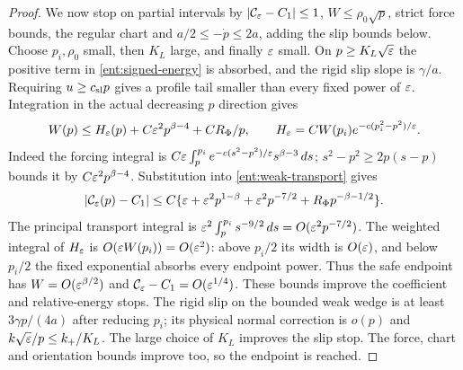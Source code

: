 \begin{proof}
We now stop on partial intervals by
$|\mathcal C_\varepsilon-C_1|\le1$, $W\le\rho_0\sqrt p$, strict force
bounds, the regular chart and $a/2\le-\dot p\le2a$, adding the
slip bounds below. Choose $p_i,\rho_0$ small, then $K_L$ large,
and finally $\varepsilon$ small. On $p\ge K_L\sqrt{\varepsilon}$ the positive
term in \eqref{ent:signed-energy} is absorbed, and the rigid slip
slope is $\gamma/a$. Requiring $u\ge c_{\rm sl}p$ gives a profile
tail smaller than every fixed power of $\varepsilon$. Integration in the
actual decreasing $p$ direction gives
\begin{equation}
 W(p)\le H_\varepsilon(p)+C\varepsilon^2p^{\beta-4}+CR_\Phi/p,\qquad
 H_\varepsilon=CW(p_i)e^{-c(p_i^2-p^2)/\varepsilon}.
 \label{ent:safe-tracking}
\end{equation}
Indeed the forcing integral is
$C\varepsilon\int_p^{p_i}e^{-c(s^2-p^2)/\varepsilon}s^{\beta-3}\,ds$;
$s^2-p^2\ge2p(s-p)$ bounds it by $C\varepsilon^2p^{\beta-4}$.
Substitution into \eqref{ent:weak-transport} gives
\begin{equation}
 |\mathcal C_\varepsilon(p)-C_1|\le
 C\{\varepsilon+\varepsilon^2p^{1-\beta}+\varepsilon^2p^{-7/2}
                           +R_\Phi p^{-\beta-1/2}\}.
 \label{ent:coefficient-bound}
\end{equation}
The principal transport integral is
$\varepsilon^2\int_p^{p_i}s^{-9/2}\,ds=O(\varepsilon^2p^{-7/2})$.
The weighted integral of $H_\varepsilon$ is $O(\varepsilon W(p_i))=O(\varepsilon^2)$:
above $p_i/2$ its width is $O(\varepsilon)$, and below $p_i/2$ the fixed
exponential absorbs every endpoint power. Thus the safe endpoint has
$W=O(\varepsilon^{\beta/2})$ and $\mathcal C_\varepsilon-C_1=O(\varepsilon^{1/4})$.
These bounds improve the coefficient and relative-energy stops.
The rigid slip on the bounded weak wedge is at least
$3\gamma p/(4a)$ after reducing $p_i$; its physical normal
correction is $o(p)$ and $k\sqrt{\varepsilon}/p\le k_+/K_L$.
The large choice of $K_L$ improves the slip stop. The force, chart
and orientation bounds improve too, so the endpoint is reached.


\end{proof}

